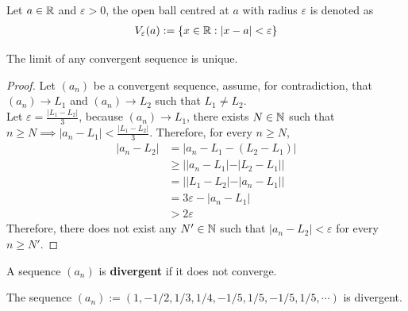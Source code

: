 \documentclass[11pt]{article}
\begin{document}
	\begin{definition}
		Let $a \in \mathbb{R}$ and $\varepsilon > 0$, the open ball centred at $a$ with radius $\varepsilon$ is denoted as 
	\begin{align}
		V_\varepsilon(a) := \left\{x \in \mathbb{R} : |x - a| < \varepsilon \right\}
	\end{align}
	\end{definition}
	
	\begin{theorem}
		The limit of any convergent sequence is unique.
	\end{theorem}
	
	\begin{proof}
		Let $(a_n)$ be a convergent sequence, assume, for contradiction, that $(a_n) \to L_1$ and $(a_n) \to L_2$ such that $L_1 \neq L_2$.\\
		Let $\varepsilon = \frac{|L_1 - L_2|}{3}$, because $(a_n) \to L_1$, there exists $N\in\mathbb{N}$ such that $n \geq N \implies |a_n - L_1| < \frac{|L_1 - L_2|}{3}$. Therefore, for every $n \geq N$,
		\begin{align}
			|a_n - L_2| &= |a_n - L_1 - (L_2 - L_1)| \\ 
			&\geq ||a_n - L_1| - |L_2 - L_1|| \\
			&= ||L_1 - L_2| - |a_n - L_1|| \\
			&= 3\varepsilon - |a_n - L_1| \\
			&> 2 \varepsilon
		\end{align}
		Therefore, there does not exist any $N' \in \mathbb{N}$ such that $|a_n - L_2| < \varepsilon$ for every $n \geq N'$.
	\end{proof}
	
	\begin{definition}
		A sequence $(a_n)$ is \textbf{divergent} if it does not converge.
	\end{definition}
	
	\begin{example}
		The sequence $(a_n) := (1, -1/2, 1/3, 1/4, -1/5, 1/5, -1/5, 1/5, \cdots)$ is divergent.
	\end{example}
	
\end{document}
